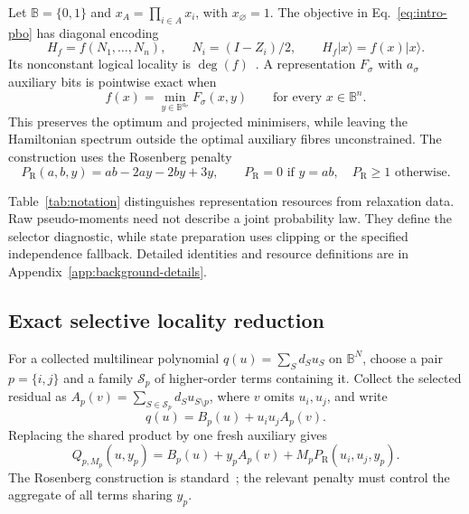 \documentclass[a4paper,onecolumn,11pt,unpublished]{quantumarticle}
\theoremstyle{remark}
\begin{document}
Let $\mathbb B=\{0,1\}$ and $x_A=\prod_{i\in A}x_i$, with
$x_\varnothing=1$. The objective in Eq.~\eqref{eq:intro-pbo} has diagonal
encoding
\begin{equation}
H_f=f(N_1,\ldots,N_n),\qquad N_i=(I-Z_i)/2,\qquad
H_f|x\rangle=f(x)|x\rangle.
\label{eq:diagonal-cost}
\end{equation}
Its nonconstant logical locality is $\deg(f)$~\cite{Hadfield2021}.
A representation $F_\sigma$ with $a_\sigma$ auxiliary bits is pointwise exact
when
\begin{equation}
f(x)=\min_{y\in\mathbb B^{a_\sigma}}F_\sigma(x,y)
\qquad\text{for every }x\in\mathbb B^n.
\label{eq:pointwise-exactness}
\end{equation}
This preserves the optimum and projected minimisers, while leaving the
Hamiltonian spectrum outside the optimal auxiliary fibres unconstrained.
The construction uses the Rosenberg penalty~\cite{Rosenberg1975}
\begin{equation}
P_{\mathrm R}(a,b,y)=ab-2ay-2by+3y,
\qquad P_{\mathrm R}=0\text{ if }y=ab,
\quad P_{\mathrm R}\geq1\text{ otherwise}.
\label{eq:rosenberg}
\end{equation}

Table~\ref{tab:notation} distinguishes representation resources from
relaxation data. Raw pseudo-moments need not describe a joint probability
law. They define the selector diagnostic, while state preparation uses
clipping or the specified independence fallback. Detailed identities and
resource definitions are in Appendix~\ref{app:background-details}.

\subsection{Exact selective locality reduction}
\label{sec:cubic-quadratization}
\label{sec:one-step-substitution}
\label{sec:compositional-exactness}

For a collected multilinear polynomial $q(u)=\sum_S d_Su_S$ on
$\mathbb B^N$, choose a pair $p=\{i,j\}$ and a family
$\mathcal S_p$ of higher-order terms containing it. Collect the selected
residual as $A_p(v)=\sum_{S\in\mathcal S_p}d_Su_{S\setminus p}$, where
$v$ omits $u_i,u_j$, and write
\begin{equation}
q(u)=B_p(u)+u_i u_jA_p(v).
\label{eq:aggregate-residual-decomposition}
\end{equation}
Replacing the shared product by one fresh auxiliary gives
\begin{equation}
Q_{p,M_p}(u,y_p)=B_p(u)+y_pA_p(v)+M_pP_{\mathrm R}(u_i,u_j,y_p).
\label{eq:one-step-reformulation}
\end{equation}
The Rosenberg construction is standard~\cite{Rosenberg1975,BorosGruber2014};
the relevant penalty must control the aggregate of all terms sharing $y_p$.
\end{document}
